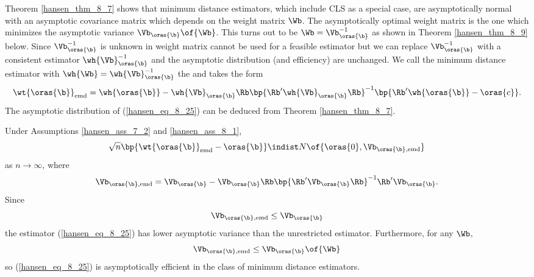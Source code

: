 Theorem \ref{hansen_thm_8_7} shows that minimum distance estimators, which include CLS as a special case, are asymptotically normal with an asymptotic covariance matrix which depends on the weight matrix $\Wb$. The asymptotically optimal weight matrix is the one which minimizes the asymptotic variance $\Vb_{\oras{\b}}\of{\Wb}$. This turns out to be $\Wb = \Vb_{\oras{\b}}^{-1}$ as shown in Theorem \ref{hansen_thm_8_9} below. Since $\Vb_{\oras{\b}}^{-1}$ is unknown in weight matrix cannot be used for a feasible estimator but we can replace $\Vb_{\oras{\b}}^{-1}$ with a consistent estimator $\wh{\Vb}_{\oras{\b}}^{-1}$ and the asymptotic distribution (and efficiency) are unchanged. We call the minimum distance estimator with $\wh{\Wb} = \wh{\Vb}_{\oras{\b}}^{-1}$ the  and takes the form 
\begin{equation}
    \label{hansen_eq_8_25}
    \wt{\oras{\b}}_{\text{emd}} = \wh{\oras{\b}} - \wh{\Vb}_{\oras{\b}} \Rb \bp{\Rb^{\prime} \wh{\Vb}_{\oras{\b}} \Rb}^{-1} \bp{\Rb^{\prime} \wh{\oras{\b}} - \oras{c}}.
\end{equation}
The asymptotic distribution of (\ref{hansen_eq_8_25}) can be deduced from Theorem \ref{hansen_thm_8_7}.

\begin{theorem}
    \label{hansen_thm_8_9}
    Under Assumptions \ref{hansen_ass_7_2} and \ref{hansen_ass_8_1}, 
    \begin{equation}
        \notag 
        \sqrt{n} \bp{\wt{\oras{\b}}_{\text{emd}} - \oras{\b}} \indist N\of{\oras{0}, \Vb_{\oras{\b}, \text{emd}}}
    \end{equation}
    as $n \rightarrow \infty$, where 
    \begin{equation}
        \label{hansen_eq_8_26}
        \Vb_{\oras{\b}, \text{emd}} = \Vb_{\oras{\b}} - \Vb_{\oras{\b}} \Rb \bp{\Rb^{\prime} \Vb_{\oras{\b}} \Rb}^{-1} \Rb^{\prime} \Vb_{\oras{\b}}. 
    \end{equation}
    Since 
    \begin{equation}
        \label{hansen_eq_8_27}
        \Vb_{\oras{\b}, \text{emd}} \leq \Vb_{\oras{\b}} 
    \end{equation}
    the estimator (\ref{hansen_eq_8_25}) has lower asymptotic variance than the unrestricted estimator. Furthermore, for any $\Wb$, 
    \begin{equation}
        \label{hansen_eq_8_28}
        \Vb_{\oras{\b}, \text{emd}} \leq \Vb_{\oras{\b}}\of{\Wb}
    \end{equation}
    so (\ref{hansen_eq_8_25}) is asymptotically efficient in the class of minimum distance estimators. 
\end{theorem}

